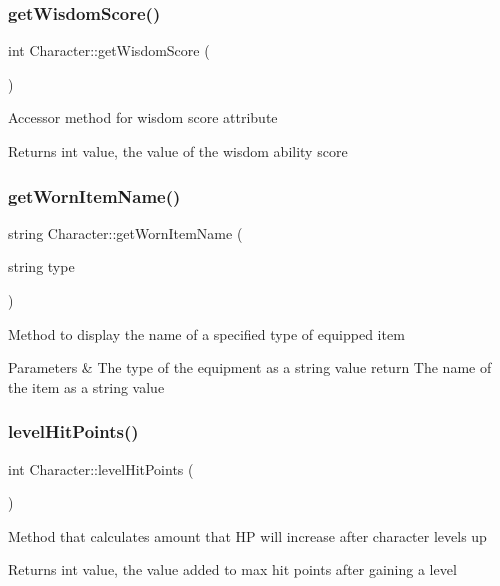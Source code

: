 \subsubsection{\texorpdfstring{get\+Wisdom\+Score()}{getWisdomScore()}}
{\footnotesize\ttfamily int Character\+::get\+Wisdom\+Score (\begin{DoxyParamCaption}{ }\end{DoxyParamCaption})}

Accessor method for wisdom score attribute \begin{DoxyReturn}{Returns}
int value, the value of the wisdom ability score 
\end{DoxyReturn}
\hypertarget{class_character_a3450bf341e820b6c14f3c3a2ebd7a3c3}{}\label{class_character_a3450bf341e820b6c14f3c3a2ebd7a3c3} 
\subsubsection{\texorpdfstring{get\+Worn\+Item\+Name()}{getWornItemName()}}
{\footnotesize\ttfamily string Character\+::get\+Worn\+Item\+Name (\begin{DoxyParamCaption}\item[{string}]{type }\end{DoxyParamCaption})}

Method to display the name of a specified type of equipped item 
\begin{DoxyParams}{Parameters}
{\em } & The type of the equipment as a string value return The name of the item as a string value \\
\hline
\end{DoxyParams}
\hypertarget{class_character_ad47ab6e5a2671f770b5a580cb60baee7}{}\label{class_character_ad47ab6e5a2671f770b5a580cb60baee7} 
\subsubsection{\texorpdfstring{level\+Hit\+Points()}{levelHitPoints()}}
{\footnotesize\ttfamily int Character\+::level\+Hit\+Points (\begin{DoxyParamCaption}{ }\end{DoxyParamCaption})}

Method that calculates amount that HP will increase after character levels up \begin{DoxyReturn}{Returns}
int value, the value added to max hit points after gaining a level 
\end{DoxyReturn}
\hypertarget{class_character_a9710bee1a9f7c1e474abff5dd55adc8d}{}\label{class_character_a9710bee1a9f7c1e474abff5dd55adc8d} 
